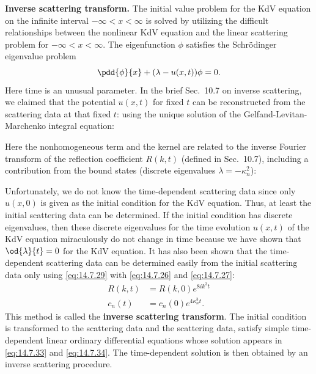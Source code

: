 \textbf{Inverse scattering transform.}  The initial value problem for the KdV equation on the infinite interval $-\infty < x < \infty$ is solved by utilizing the difficult relationships between the nonlinear KdV equation and the linear scattering problem for $-\infty < x < \infty$.  The eigenfunction $\phi$ satisfies the Schr\"odinger eigenvalue problem
\begin{equation}
\label{eq:14.7.29}
\pdd{\phi}{x} + (\lambda - u(x,t))\phi = 0.
\end{equation}
Here time is an unusual parameter.  In the brief Sec.~10.7 on inverse scattering, we claimed that the potential $u(x,t)$ for fixed $t$ can be reconstructed from the scattering data at that fixed $t$:
using the unique solution of the Gelfand-Levitan-Marchenko integral equation:

Here the nonhomogeneous term and the kernel are related to the inverse Fourier transform of the reflection coefficient $R(k,t)$ (defined in Sec.~10.7), including a contribution from the bound states (discrete eigenvalues $\lambda = -\kappa_n^2$):

Unfortunately, we do not know the time-dependent scattering data since only $u(x,0)$ is given as the initial condition for the KdV equation.  Thus, at least the initial scattering data can be determined.  If the initial condition has discrete eigenvalues, then these discrete eigenvalues for the time evolution $u(x,t)$ of the KdV equation miraculously do not change in time because we have shown that $\od{\lambda}{t} = 0$ for the KdV equation.  It has also been shown that the time-dependent scattering data can be determined easily from the initial scattering data only using \eqref{eq:14.7.29} with \eqref{eq:14.7.26} and \eqref{eq:14.7.27}:
\begin{align}
\label{eq:14.7.33}
R(k,t) &= R(k,0)e^{8ik^3 t} \\
\label{eq:14.7.34}
c_n(t) &= c_n(0)e^{4\kappa_n^3 t}.
\end{align}
This method is called the \textbf{inverse scattering transform}.  The initial condition is transformed to the scattering data and the scattering data, satisfy simple time-dependent linear ordinary differential equations whose solution appears in \eqref{eq:14.7.33} and \eqref{eq:14.7.34}.  The time-dependent solution is then obtained by an inverse scattering procedure.

